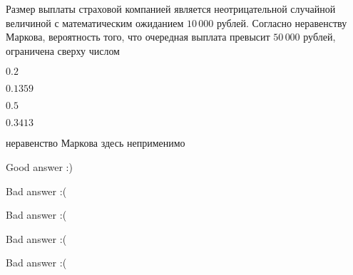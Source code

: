 
\begin{question}
Размер выплаты страховой компанией является неотрицательной случайной
величиной с математическим ожиданием \(10\,000\) рублей. Согласно
неравенству Маркова, вероятность того, что очередная выплата превысит
\(50\,000\) рублей, ограничена сверху числом
\begin{answerlist}
  \item \(0.2\)
  \item \(0.1359\)
  \item \(0.5\)
  \item \(0.3413\)
  \item неравенство Маркова здесь неприменимо
\end{answerlist}
\end{question}

\begin{solution}
\begin{answerlist}
  \item Good answer :)
  \item Bad answer :(
  \item Bad answer :(
  \item Bad answer :(
  \item Bad answer :(
\end{answerlist}
\end{solution}

